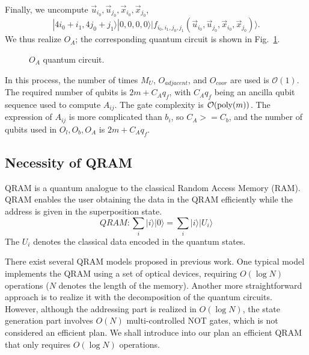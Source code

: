\documentclass[%
 reprint,
 amsmath,amssymb,
pra,
]{revtex4-1}
\begin{document}
Finally, we uncompute $\vec{u}_{i_0},\vec{u}_{j_0},\vec{x}_{i_0},\vec{x}_{j_0}$,
\begin{equation}
|4i_0+i_1,4j_0+j_1\rangle|0,0,0,0\rangle
|f_{i_0,i_1,j_0,j_1}(\vec{u}_{i_0},\vec{u}_{j_0},\vec{x}_{i_0},\vec{x}_{j_0})\rangle.
\end{equation}
We thus realize $O_A$; the corresponding quantum circuit is shown in Fig.~\ref{fig:OA}.

\begin{figure}[htbp]
    \caption{$O_A$ quantum circuit. }
    \label{fig:OA}
\end{figure}

In this process, the number of times $M_U$, $O_{adjacent}$, and $O_{coor}$ are used is $\mathcal{O}(1)$. The required number of qubits is $2m+C_Aq_f$, with $C_Aq_f$ being an ancilla qubit sequence used to compute $A_{ij}$. The gate complexity is $\mathcal{O}({\rm poly}(m))$. The expression of $A_{ij}$ is more complicated than $b_i$, so $C_A>=C_b$, and the number of qubits used in $O_l,O_b,O_A$ is $2m+C_Aq_f$.

\subsection{Necessity of QRAM}\label{NecessityQRAM}

QRAM is a quantum analogue to the classical Random Access Memory (RAM). QRAM enables the user obtaining the data in the QRAM efficiently while the address is given in the superposition state. 
\begin{equation}
QRAM: \sum_i{|i\rangle|0\rangle}=\sum_i{|i\rangle|U_i\rangle}
\end{equation}
The $U_i$ denotes the classical data encoded in the quantum states.

There exist several QRAM models proposed in previous work. One typical model implements the QRAM using a set of optical devices, requiring $O(\log N)$ operations ($N$ denotes the length of the memory). Another more straightforward approach is to realize it with the decomposition of the quantum circuits. However, although the addressing part is realized in $O(\log N)$, the state generation part involves $O(N)$ multi-controlled NOT gates, which is not considered an efficient plan.
We shall introduce into our plan an efficient QRAM that only requires $O(\log N)$ operations.
\end{document}
